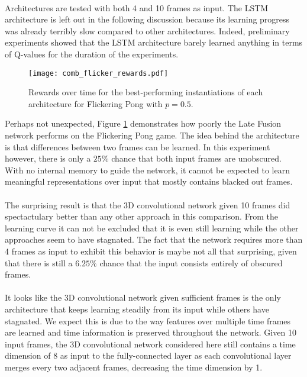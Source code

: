 \paragraph{}
Architectures are tested with both 4 and 10 frames as input.
The LSTM architecture is left out in the following discussion
because its learning progress
was already terribly slow compared to other architectures.
Indeed, preliminary experiments
showed that the LSTM architecture
barely learned anything in terms of Q-values for the duration
of the experiments.

\begin{figure}[htpb]
  \centering
  \texttt{[image: comb\_flicker\_rewards.pdf]}
  \caption[Architecture performance comparison on Flickering Pong]{
    Rewards over time
    for the best-performing instantiations
    of each architecture
    for Flickering Pong
    with $p=0.5$.
  }
  \label{fig:comb_flicker_rewards}
\end{figure}

Perhaps not unexpected,
Figure \ref{fig:comb_flicker_rewards}
demonstrates how poorly the Late Fusion network
performs on the Flickering Pong game.
The idea behind the architecture
is that differences between two frames can be learned.
In this experiment however,
there is only a $25\%$ chance
that both input frames are unobscured.
With no internal memory to guide the network,
it cannot be expected to learn meaningful representations
over input that mostly contains blacked out frames.

\paragraph{}
The surprising result is that the 3D convolutional network given 10 frames
did spectactulary better than any other approach in this comparison.
From the learning curve it can not be excluded that it is
even still learning while the other approaches
seem to have stagnated.
The fact that the network requires more than 4 frames as input
to exhibit this behavior is maybe not all that surprising,
given that there is still a $6.25\%$ chance
that the input consists entirely of obscured frames.

\paragraph{}
It looks like the 3D convolutional network
given sufficient frames is the only architecture
that keeps learning steadily from its input
while others have stagnated.
We expect this is due to the way
features over multiple time frames are learned
and time information is preserved throughout the network.
Given 10 input frames,
the 3D convolutional network considered here
still contains a time dimension of 8 as input to the fully-connected layer
as each convolutional layer merges every two adjacent frames,
decreasing the time dimension by 1.
